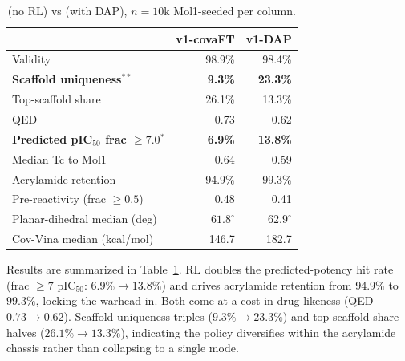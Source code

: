 \begin{table}[!ht]
\centering
\caption{\Cvcovaft{} (no RL) vs \Cvdap{} (with DAP), $n{=}10\text{k}$ Mol1-seeded per column.}
\label{tab:rl_value}
\small
\setlength{\tabcolsep}{6pt}
\renewcommand{\arraystretch}{1.15}
\begin{tabular}{lrr}
\toprule
                                            & \textbf{v1-covaFT}          & \textbf{v1-DAP}      \\
\midrule
Validity                                    & 98.9\%                      & 98.4\%         \\
\textbf{Scaffold uniqueness}$^{**}$          & \textbf{9.3\%}              & \textbf{23.3\%} \\
Top-scaffold share                          & 26.1\%                      & 13.3\%         \\
QED                                          & 0.73                        & 0.62           \\
\textbf{Predicted pIC$_{50}$ frac $\ge 7.0$}$^{*}$ & \textbf{6.9\%}         & \textbf{13.8\%} \\
Median Tc to Mol1                           & 0.64                        & 0.59           \\
Acrylamide retention                         & 94.9\%                      & 99.3\%          \\
Pre-reactivity (frac $\ge 0.5$)             & 0.48                        & 0.41           \\
Planar-dihedral median (deg)                & $61.8^\circ$                & $62.9^\circ$   \\
Cov-Vina median (kcal/mol)                  & 146.7                       & 182.7          \\
\bottomrule
\end{tabular}
\end{table}

Results are summarized in Table~\ref{tab:rl_value}. RL doubles the predicted-potency hit rate (frac $\ge 7$ pIC$_{50}$: $6.9\% \to 13.8\%$) and drives acrylamide retention from $94.9\%$ to $99.3\%$, locking the warhead in. Both come at a cost in drug-likeness (QED $0.73 \to 0.62$). Scaffold uniqueness triples ($9.3\% \to 23.3\%$) and top-scaffold share halves ($26.1\% \to 13.3\%$), indicating the policy diversifies within the acrylamide chassis rather than collapsing to a single mode.


